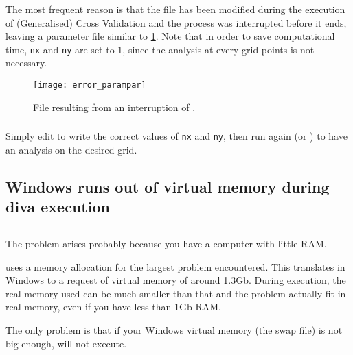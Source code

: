 \subsubsection{\question}

The most frequent reason is that the  file has been modified during the execution of (Generalised) Cross Validation and the process was interrupted before it ends, leaving a parameter file similar to \ref{fig:errorparampar}. Note that in order to save computational time, \texttt{nx} and \texttt{ny} are set to $1$, since the analysis at every grid points is not necessary.

\begin{figure}[htpb]
\centering
\texttt{[image: error\_parampar]}
\caption{File  resulting from an interruption of .\label{fig:errorparampar}}
\end{figure}

\subsubsection{\answer}


Simply edit  to write the correct values of \texttt{nx} and \texttt{ny}, then run again  (or ) to have an analysis on the desired grid.


\subsection{Windows runs out of virtual memory during diva execution}


\subsection{\question}

The problem arises probably because you have a computer with little RAM.

\diva uses a memory allocation for the largest problem encountered. This 
translates in Windows to a request of virtual memory of around 1.3Gb.
During execution, the real memory used can be much smaller than that and 
the problem actually fit in real memory, even if you have less than 1Gb RAM.

The only problem is that if your Windows virtual memory (the swap file) 
is not big enough, \diva will not execute.


